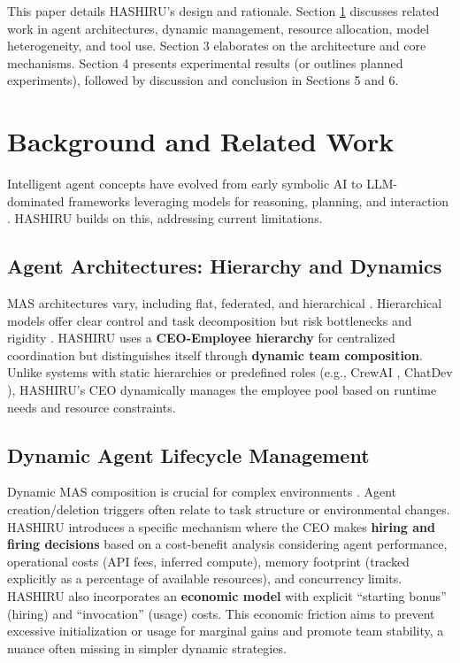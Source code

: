 \documentclass[conference]{IEEEtran}
\begin{document}
This paper details HASHIRU's design and rationale. Section \ref{sec:background} discusses related work in agent architectures, dynamic management, resource allocation, model heterogeneity, and tool use. Section 3 elaborates on the architecture and core mechanisms. Section 4 presents experimental results (or outlines planned experiments), followed by discussion and conclusion in Sections 5 and 6.

\section{Background and Related Work} \label{sec:background}

Intelligent agent concepts have evolved from early symbolic AI \cite{russell2010artificial, shoham1994agent} to LLM-dominated frameworks leveraging models for reasoning, planning, and interaction \cite{wang2023survey, xi2023rise}. HASHIRU builds on this, addressing current limitations.

\subsection{Agent Architectures: Hierarchy and Dynamics}
MAS architectures vary, including flat, federated, and hierarchical \cite{dorri2018multi, horling2004survey}. Hierarchical models offer clear control and task decomposition but risk bottlenecks and rigidity \cite{gaston2005agenta,gaston2005agentb}. HASHIRU uses a \textbf{CEO-Employee hierarchy} for centralized coordination but distinguishes itself through \textbf{dynamic team composition}. Unlike systems with static hierarchies or predefined roles (e.g., CrewAI \cite{crewai}, ChatDev \cite{qian2023communicative}), HASHIRU's CEO dynamically manages the employee pool based on runtime needs and resource constraints.

\subsection{Dynamic Agent Lifecycle Management}
Dynamic MAS composition is crucial for complex environments \cite{valckenaers2005trends}. Agent creation/deletion triggers often relate to task structure or environmental changes. HASHIRU introduces a specific mechanism where the CEO makes \textbf{hiring and firing decisions} based on a cost-benefit analysis considering agent performance, operational costs (API fees, inferred compute), memory footprint (tracked explicitly as a percentage of available resources), and concurrency limits. HASHIRU also incorporates an \textbf{economic model} with explicit ``starting bonus'' (hiring) and ``invocation'' (usage) costs. This economic friction aims to prevent excessive initialization or usage for marginal gains and promote team stability, a nuance often missing in simpler dynamic strategies.
\end{document}
